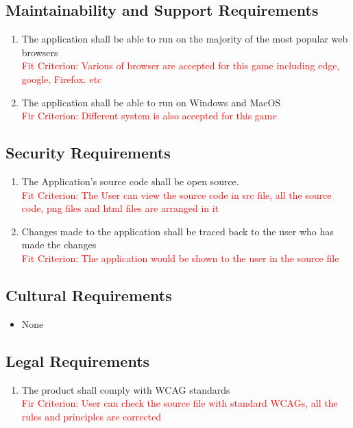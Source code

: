 \documentclass[12pt, titlepage]{article}
\begin{document}
\subsection{Maintainability and Support Requirements}
\begin{enumerate}
\item The application shall be able to run on the majority of the most popular web browsers\\
\textcolor{red}{Fit Criterion: Various of browser are accepted for this game including edge, google, Firefox. etc }
\item The application shall be able to run on Windows and MacOS\\
\textcolor{red}{Fir Criterion: Different system is also accepted for this game}
\end{enumerate}

\subsection{Security Requirements}
\begin{enumerate}
    \item The Application's source code shall be open source.\\
    \textcolor{red}{Fit Criterion: The User can view the source code in src file, all the source code, png files and html files are arranged in it}
    \item Changes made to the application shall be traced back to the user who has made the changes\\
    \textcolor{red}{Fit Criterion: The application would be shown to the user in the source file}
\end{enumerate}

\subsection{Cultural Requirements}
\begin{itemize}
    \item None
\end{itemize}
\subsection{Legal Requirements}
\begin{enumerate}
    \item The product shall comply with WCAG standards\\
    \textcolor{red}{Fir Criterion: User can check the source file with standard WCAGs, all the rules and principles are corrected}
    \end{enumerate}
\end{document}
